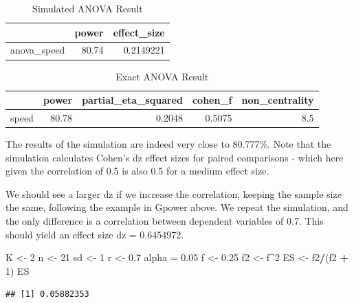 \documentclass[]{book}
\newenvironment{Shaded}{\begin{snugshade}}{\end{snugshade}}
\newcommand{\DecValTok}[1]{\textcolor[rgb]{0.00,0.00,0.81}{#1}}
\newcommand{\FloatTok}[1]{\textcolor[rgb]{0.00,0.00,0.81}{#1}}
\newcommand{\NormalTok}[1]{#1}
\newcommand{\OperatorTok}[1]{\textcolor[rgb]{0.81,0.36,0.00}{\textbf{#1}}}
\newcommand{\StringTok}[1]{\textcolor[rgb]{0.31,0.60,0.02}{#1}}
\begin{document}
\begin{table}[!h]

\caption{\label{tab:unnamed-chunk-98}Simulated ANOVA Result}
\centering
\begin{tabular}{l|r|r}
\hline
  & power & effect\_size\\
\hline
anova\_speed & 80.74 & 0.2149221\\
\hline
\end{tabular}
\end{table}

\begin{table}[!h]

\caption{\label{tab:unnamed-chunk-100}Exact ANOVA Result}
\centering
\begin{tabular}{l|r|r|r|r}
\hline
  & power & partial\_eta\_squared & cohen\_f & non\_centrality\\
\hline
speed & 80.78 & 0.2048 & 0.5075 & 8.5\\
\hline
\end{tabular}
\end{table}

The results of the simulation are indeed very close to 80.777\%. Note that the simulation calculates Cohen's dz effect sizes for paired comparisons - which here given the correlation of 0.5 is also 0.5 for a medium effect size.

We should see a larger dz if we increase the correlation, keeping the sample size the same, following the example in Gpower above. We repeat the simulation, and the only difference is a correlation between dependent variables of 0.7. This should yield an effect size dz = 0.6454972.

\begin{Shaded}
\begin{Highlighting}[]
\NormalTok{K <-}\StringTok{ }\DecValTok{2}
\NormalTok{n <-}\StringTok{ }\DecValTok{21}
\NormalTok{sd <-}\StringTok{ }\DecValTok{1}
\NormalTok{r <-}\StringTok{ }\FloatTok{0.7}
\NormalTok{alpha =}\StringTok{ }\FloatTok{0.05}
\NormalTok{f <-}\StringTok{ }\FloatTok{0.25}
\NormalTok{f2 <-}\StringTok{ }\NormalTok{f}\OperatorTok{^}\DecValTok{2}
\NormalTok{ES <-}\StringTok{ }\NormalTok{f2}\OperatorTok{/}\NormalTok{(f2 }\OperatorTok{+}\StringTok{ }\DecValTok{1}\NormalTok{)}
\NormalTok{ES}
\end{Highlighting}
\end{Shaded}

\begin{verbatim}
## [1] 0.05882353
\end{verbatim}
\end{document}
